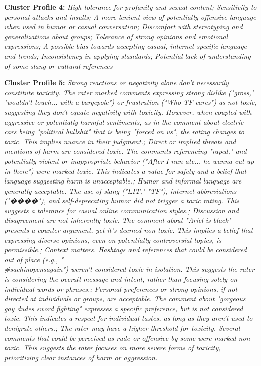 \documentclass[11pt]{article}
\newcommand{\profiletext}[1]{\textit{#1}}
\begin{document}
\textbf{Cluster Profile 4:} \profiletext{High tolerance for profanity and sexual content; Sensitivity to personal attacks and insults; A more lenient view of potentially offensive language when used in humor or casual conversation; Discomfort with stereotyping and generalizations about groups; Tolerance of strong opinions and emotional expressions; A possible bias towards accepting casual, internet-specific language and trends; Inconsistency in applying standards; Potential lack of understanding of some slang or cultural references}

\textbf{Cluster Profile 5:} \profiletext{Strong reactions or negativity alone don't necessarily constitute toxicity. The rater marked comments expressing strong dislike ("gross," "wouldn't touch... with a bargepole") or frustration ("Who TF cares") as not toxic, suggesting they don't equate negativity with toxicity.  However, when coupled with aggressive or potentially harmful sentiments, as in the comment about electric cars being "political bullshit" that is being "forced on us", the rating changes to toxic. This implies nuance in their judgment.; Direct or implied threats and mentions of harm are considered toxic. The comments referencing "raped," and potentially violent or inappropriate behavior ("After I nun ate... he wanna cut up in there") were marked toxic. This indicates a value for safety and a belief that language suggesting harm is unacceptable.; Humor and informal language are generally acceptable.  The use of slang ("LIT," "TF"), internet abbreviations ("����"), and self-deprecating humor did not trigger a toxic rating. This suggests a tolerance for casual online communication styles.; Discussion and disagreement are not inherently toxic.  The comment about "Ariel is black" presents a counter-argument, yet it's deemed non-toxic. This implies a belief that expressing diverse opinions, even on potentially controversial topics, is permissible.; Context matters. Hashtags and references that could be considered out of place (e.g., "\\#sachinopensagain") weren't considered toxic in isolation.  This suggests the rater is considering the overall message and intent, rather than focusing solely on individual words or phrases.; Personal preferences or strong opinions, if not directed at individuals or groups, are acceptable. The comment about "gorgeous gay dudes sword fighting" expresses a specific preference, but is not considered toxic. This indicates a respect for individual tastes, as long as they aren't used to denigrate others.; The rater may have a higher threshold for toxicity. Several comments that could be perceived as rude or offensive by some were marked non-toxic.  This suggests the rater focuses on more severe forms of toxicity, prioritizing clear instances of harm or aggression.}
\end{document}
